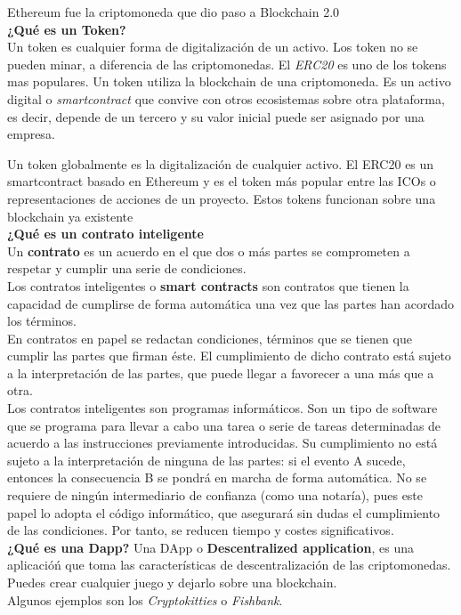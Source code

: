 \documentclass[a4paper,12pt]{lib/pub}
\begin{document}
Ethereum fue la criptomoneda que dio paso a Blockchain 2.0\\

\textbf{¿Qué es un Token?}\\
Un token es cualquier forma de digitalización de un activo. Los token no se pueden minar, a diferencia de las criptomonedas. El \textit{ERC20} es uno de los tokens mas populares. Un token utiliza la blockchain de una criptomoneda.
Es un activo digital o \textit{smartcontract} que convive con otros ecosistemas sobre otra plataforma, es decir, depende de un tercero y su valor inicial puede ser asignado por una empresa.

Un token globalmente es la digitalización de cualquier activo. El ERC20 es un smartcontract basado en Ethereum y es el token más popular entre las ICOs o representaciones de acciones de un proyecto. Estos tokens funcionan sobre una blockchain ya existente\\

\textbf{¿Qué es un contrato inteligente}\\
Un \textbf{contrato} es un acuerdo en el que dos o más partes se comprometen a respetar y cumplir una serie de condiciones.\\
Los contratos inteligentes o \textbf{smart contracts} son contratos que tienen la capacidad de cumplirse de forma automática una vez que las partes han acordado los términos.
\\
En contratos en papel se redactan condiciones, términos que se tienen que cumplir las partes que firman éste. El cumplimiento de dicho contrato está sujeto a la interpretación de las partes, que puede llegar a favorecer a una más que a otra.\\

Los contratos inteligentes son programas informáticos. Son un tipo de software que se programa para llevar a cabo una tarea o serie de tareas determinadas de acuerdo a las instrucciones previamente introducidas. Su cumplimiento no está sujeto a la interpretación de ninguna de las partes: si el evento A sucede, entonces la consecuencia B se pondrá en marcha de forma automática. No se requiere de ningún intermediario de confianza (como una notaría), pues este papel lo adopta el código informático, que asegurará sin dudas el cumplimiento de las condiciones. Por tanto, se reducen tiempo y costes significativos.\\

\textbf{¿Qué es una Dapp?}
Una DApp o \textbf{Descentralized application}, es una aplicacióń que toma las características de descentralización de las criptomonedas. Puedes crear cualquier juego y dejarlo sobre una blockchain.\\ Algunos ejemplos son los \textit{Cryptokitties} o \textit{Fishbank}.
\end{document}
